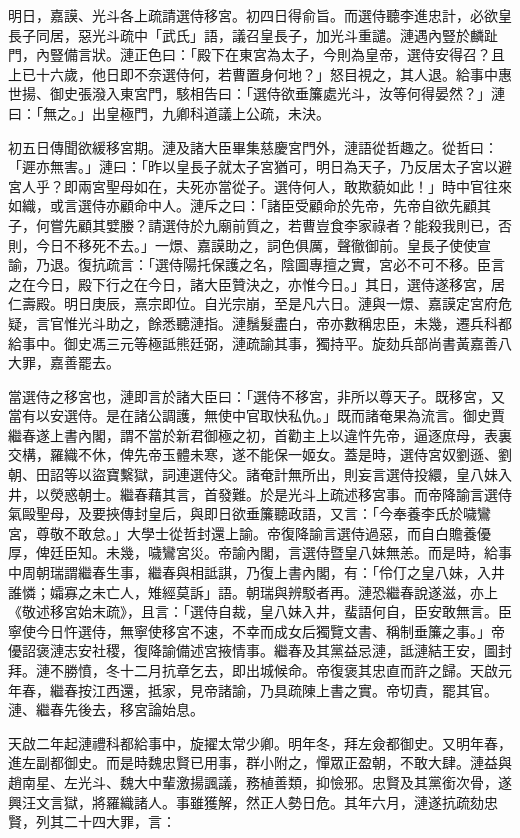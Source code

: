 \begin{pinyinscope}
明日，嘉謨、光斗各上疏請選侍移宮。初四日得俞旨。而選侍聽李進忠計，必欲皇長子同居，惡光斗疏中「武氏」語，議召皇長子，加光斗重譴。漣遇內豎於麟趾門，內豎備言狀。漣正色曰：「殿下在東宮為太子，今則為皇帝，選侍安得召？且上已十六歲，他日即不奈選侍何，若曹置身何地？」怒目視之，其人退。給事中惠世揚、御史張潑入東宮門，駭相告曰：「選侍欲垂簾處光斗，汝等何得晏然？」漣曰：「無之。」出皇極門，九卿科道議上公疏，未決。

初五日傳聞欲緩移宮期。漣及諸大臣畢集慈慶宮門外，漣語從哲趣之。從哲曰：「遲亦無害。」漣曰：「昨以皇長子就太子宮猶可，明日為天子，乃反居太子宮以避宮人乎？即兩宮聖母如在，夫死亦當從子。選侍何人，敢欺藐如此！」時中官往來如織，或言選侍亦顧命中人。漣斥之曰：「諸臣受顧命於先帝，先帝自欲先顧其子，何嘗先顧其嬖媵？請選侍於九廟前質之，若曹豈食李家祿者？能殺我則已，否則，今日不移死不去。」一燝、嘉謨助之，詞色俱厲，聲徹御前。皇長子使使宣諭，乃退。復抗疏言：「選侍陽托保護之名，陰圖專擅之實，宮必不可不移。臣言之在今日，殿下行之在今日，諸大臣贊決之，亦惟今日。」其日，選侍遂移宮，居仁壽殿。明日庚辰，熹宗即位。自光宗崩，至是凡六日。漣與一燝、嘉謨定宮府危疑，言官惟光斗助之，餘悉聽漣指。漣鬚髮盡白，帝亦數稱忠臣，未幾，遷兵科都給事中。御史馮三元等極詆熊廷弼，漣疏諭其事，獨持平。旋劾兵部尚書黃嘉善八大罪，嘉善罷去。

當選侍之移宮也，漣即言於諸大臣曰：「選侍不移宮，非所以尊天子。既移宮，又當有以安選侍。是在諸公調護，無使中官取快私仇。」既而諸奄果為流言。御史賈繼春遂上書內閣，謂不當於新君御極之初，首勸主上以違忤先帝，逼逐庶母，表裏交構，羅織不休，俾先帝玉體未寒，遂不能保一姬女。蓋是時，選侍宮奴劉遜、劉朝、田詔等以盜寶繫獄，詞連選侍父。諸奄計無所出，則妄言選侍投繯，皇八妹入井，以熒惑朝士。繼春藉其言，首發難。於是光斗上疏述移宮事。而帝降諭言選侍氣毆聖母，及要挾傳封皇后，與即日欲垂簾聽政語，又言：「今奉養李氏於噦鸞宮，尊敬不敢怠。」大學士從哲封還上諭。帝復降諭言選侍過惡，而自白贍養優厚，俾廷臣知。未幾，噦鸞宮災。帝諭內閣，言選侍暨皇八妹無恙。而是時，給事中周朝瑞謂繼春生事，繼春與相詆諆，乃復上書內閣，有：「伶仃之皇八妹，入井誰憐；孀寡之未亡人，雉經莫訴」語。朝瑞與辨駁者再。漣恐繼春說遂滋，亦上《敬述移宮始末疏》，且言：「選侍自裁，皇八妹入井，蜚語何自，臣安敢無言。臣寧使今日忤選侍，無寧使移宮不速，不幸而成女后獨覽文書、稱制垂簾之事。」帝優詔褒漣志安社稷，復降諭備述宮掖情事。繼春及其黨益忌漣，詆漣結王安，圖封拜。漣不勝憤，冬十二月抗章乞去，即出城候命。帝復褒其忠直而許之歸。天啟元年春，繼春按江西還，抵家，見帝諸諭，乃具疏陳上書之實。帝切責，罷其官。漣、繼春先後去，移宮論始息。

天啟二年起漣禮科都給事中，旋擢太常少卿。明年冬，拜左僉都御史。又明年春，進左副都御史。而是時魏忠賢已用事，群小附之，憚眾正盈朝，不敢大肆。漣益與趙南星、左光斗、魏大中輩激揚諷議，務植善類，抑憸邪。忠賢及其黨銜次骨，遂興汪文言獄，將羅織諸人。事雖獲解，然正人勢日危。其年六月，漣遂抗疏劾忠賢，列其二十四大罪，言：


\end{pinyinscope}
